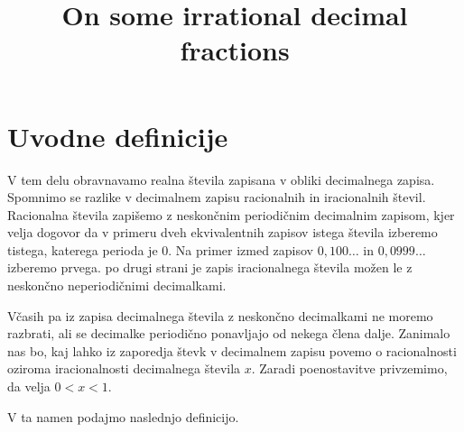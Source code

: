 \documentclass[twoside,11pt]{article}
\begin{document}




\klasifikacija{~} 


\title{On some irrational decimal fractions}



\glava\baselineskip=14.5pt

\smallskip


\section{Uvodne definicije}
V tem delu obravnavamo realna števila zapisana v obliki decimalnega zapisa.
Spomnimo se razlike v decimalnem zapisu racionalnih in iracionalnih števil.
Racionalna števila zapišemo z neskončnim periodičnim decimalnim zapisom, 
kjer velja dogovor da v primeru dveh ekvivalentnih zapisov istega števila izberemo tistega, katerega perioda je $0$.
Na primer izmed zapisov $0,100 \dots$ in $0,0999 \dots$ izberemo prvega. 
po drugi strani je zapis iracionalnega števila možen 
le z neskončno neperiodičnimi decimalkami.

Včasih pa iz zapisa decimalnega števila z neskončno decimalkami ne moremo razbrati, ali 
se decimalke periodično ponavljajo od nekega člena dalje.
Zanimalo nas bo, kaj lahko iz zaporedja števk v decimalnem zapisu povemo o racionalnosti oziroma iracionalnosti
decimalnega števila $x$.
Zaradi poenostavitve privzemimo, da velja $ 0 < x < 1$.

V ta namen podajmo naslednjo definicijo.
\end{document}
